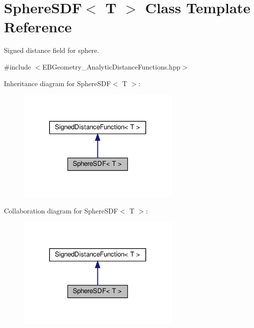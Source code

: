 \hypertarget{classSphereSDF}{}\section{Sphere\+S\+DF$<$ T $>$ Class Template Reference}
\label{classSphereSDF}


Signed distance field for sphere.  




{\ttfamily \#include $<$E\+B\+Geometry\+\_\+\+Analytic\+Distance\+Functions.\+hpp$>$}



Inheritance diagram for Sphere\+S\+DF$<$ T $>$\+:\nopagebreak
\begin{figure}[H]
\begin{center}
\leavevmode
\includegraphics[width=227pt]{classSphereSDF__inherit__graph}
\end{center}
\end{figure}


Collaboration diagram for Sphere\+S\+DF$<$ T $>$\+:\nopagebreak
\begin{figure}[H]
\begin{center}
\leavevmode
\includegraphics[width=227pt]{classSphereSDF__coll__graph}
\end{center}
\end{figure}
